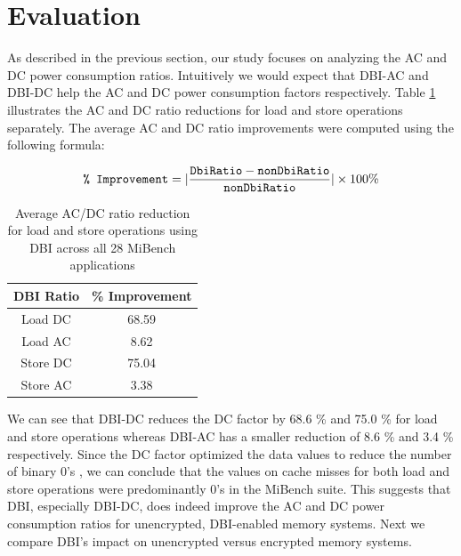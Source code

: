 \section{Evaluation}
\label{sec-evaluation}


As described in the previous section, our study focuses on analyzing the AC and
DC power consumption ratios. Intuitively we would expect that DBI-AC and DBI-DC
help the AC and DC power consumption factors respectively. Table
\ref{table:dbi-ratios} illustrates the AC and DC ratio reductions for load and
store operations separately. The average AC and DC ratio improvements were
computed using the following formula:

$$ \texttt{\% Improvement} = |\frac{\texttt{DbiRatio} - \texttt{nonDbiRatio}}{\texttt{nonDbiRatio}}| \times 100\%$$

\begin{table}[!htb]
  \centering
    \begin{tabular}{| c | c |}
      \hline
      \textbf{DBI Ratio} & \textbf{\% Improvement} \\ \hline
     Load DC  & 68.59 \\ \hline
     Load AC  & 8.62  \\ \hline
     Store DC & 75.04 \\ \hline
     Store AC & 3.38  \\ \hline
    \end{tabular}
    \caption{Average AC/DC ratio reduction for load and store operations using
    DBI across all 28 MiBench applications}
    \label{table:dbi-ratios}
\end{table}

We can see that DBI-DC reduces the DC factor by 68.6 \% and 75.0 \% for load and
store operations whereas DBI-AC has a smaller reduction of 8.6 \%
and 3.4 \% respectively. Since the DC factor optimized the data values to
reduce the number of binary $0$'s \cite{low-power-dram}, we can conclude that
the values on cache misses for both load and store operations were
predominantly $0$'s  in the MiBench suite. This suggests that DBI, especially
DBI-DC, does indeed improve the AC and DC power consumption ratios for
unencrypted, DBI-enabled memory systems. Next we compare DBI's impact on
unencrypted versus encrypted memory systems.

